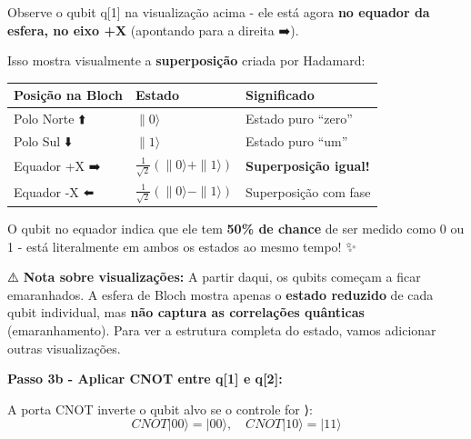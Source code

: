 \documentclass[
  brazilian,
]{report}
\newcounter{none} %
\begin{document}
Observe o qubit q{[}1{]} na visualização acima - ele está agora
\textbf{no equador da esfera, no eixo +X} (apontando para a direita ➡️).

Isso mostra visualmente a \textbf{superposição} criada por Hadamard:

{\def\LTcaptype{none} %
\begin{longtable}[]{@{}
  >{\raggedright\arraybackslash}p{}
  >{\raggedright\arraybackslash}p{}
  >{\raggedright\arraybackslash}p{}@{}}
\toprule\noalign{}
\begin{minipage}[b]{\linewidth}\raggedright
Posição na Bloch
\end{minipage} & \begin{minipage}[b]{\linewidth}\raggedright
Estado
\end{minipage} & \begin{minipage}[b]{\linewidth}\raggedright
Significado
\end{minipage} \\
\midrule\noalign{}
\endhead
\bottomrule\noalign{}
\endlastfoot
Polo Norte ⬆️ & \(\|0\rangle\) & Estado puro ``zero'' \\
Polo Sul ⬇️ & \(\|1\rangle\) & Estado puro ``um'' \\
Equador +X ➡️ & \(\frac{1}{\sqrt{2}}(\|0\rangle + \|1\rangle)\) &
\textbf{Superposição igual!} \\
Equador -X ⬅️ & \(\frac{1}{\sqrt{2}}(\|0\rangle - \|1\rangle)\) &
Superposição com fase \\
\end{longtable}
}

O qubit no equador indica que ele tem \textbf{50\% de chance} de ser
medido como 0 ou 1 - está literalmente em ambos os estados ao mesmo
tempo! ✨

⚠️ \textbf{Nota sobre visualizações:} A partir daqui, os qubits começam
a ficar emaranhados. A esfera de Bloch mostra apenas o \textbf{estado
reduzido} de cada qubit individual, mas \textbf{não captura as
correlações quânticas} (emaranhamento). Para ver a estrutura completa do
estado, vamos adicionar outras visualizações.

\textbf{Passo 3b - Aplicar CNOT entre q{[}1{]} e q{[}2{]}:}

A porta CNOT inverte o qubit alvo se o controle for ⟩:
\[CNOT|00\rangle = |00\rangle, \quad CNOT|10\rangle = |11\rangle\]
\end{document}
